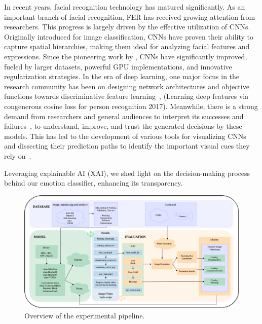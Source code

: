 In recent years, facial recognition technology has matured significantly. 
As an important branch of facial recognition, FER has received growing attention from researchers. 
This progress is largely driven by the effective utilization of CNNs. 
Originally introduced for image classification, CNNs have proven their ability to capture spatial hierarchies, 
making them ideal for analyzing facial features and expressions. 
Since the pioneering work by \citet{Lecun89Backpropagation}, 
CNNs have significantly improved, fueled by larger datasets, 
powerful GPU implementations, and innovative regularization strategies.
In the era of deep learning, one major focus in the research community has been on designing network architectures and objective functions towards discriminative feature learning~\cite{HeZRS16,WenZL016}, 
(Learning deep features via congenerous cosine loss for person recognition 2017). 
Meanwhile, there is a strong demand from researchers and general audiences to interpret its successes and failures~\cite{GoodfellowSS14}, 
to understand, improve, and trust the generated decisions by these models. 
This has led to the development of various tools for visualizing CNNs and dissecting their prediction paths to identify the important visual cues they rely on~\cite{olah2018building}. 

Leveraging explainable AI (XAI), 
we shed light on the decision-making process behind our emotion classifier, 
enhancing its transparency. 

\begin{figure}[ht]
  \centering
   \includegraphics[width=\linewidth]{pipeline.png}
   \caption{Overview of the experimental pipeline.} 
   \label{fig:pipeline}
\end{figure}

